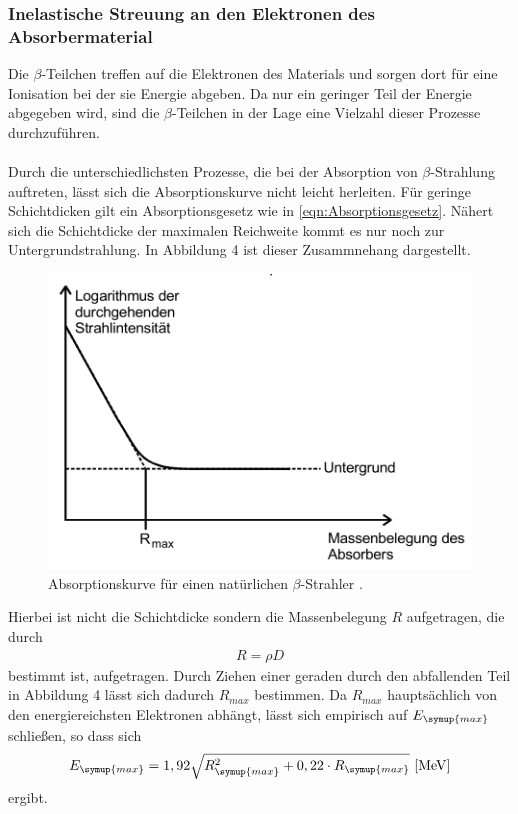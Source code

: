 \subsubsection{Inelastische Streuung an den Elektronen des Absorbermaterial}
\label{sec:inelastischeStreuungAbsorber}
Die $\beta$-Teilchen treffen auf die Elektronen des Materials und sorgen dort für eine Ionisation bei
der sie Energie abgeben. Da nur ein geringer Teil der Energie abgegeben wird, sind die $\beta$-Teilchen
in der Lage eine Vielzahl dieser Prozesse durchzuführen.\\
\\
Durch die unterschiedlichsten Prozesse, die bei der Absorption von $\beta$-Strahlung auftreten, lässt sich
die Absorptionskurve nicht leicht herleiten. Für geringe Schichtdicken gilt ein Absorptionsgesetz wie in
\autoref{eqn:Absorptionsgesetz}. Nähert sich die Schichtdicke der maximalen Reichweite kommt es nur noch
zur Untergrundstrahlung. In Abbildung 4 ist dieser Zusammnehang dargestellt.
\begin{figure}
    \centering
    \label{fig:Absorptionskurveb}
    \includegraphics{Bilder/Absorptionskurve.png}
    \caption{Absorptionskurve für einen natürlichen $\beta$-Strahler \cite{sample}.}
\end{figure}
Hierbei ist nicht die Schichtdicke sondern die Massenbelegung $R$ aufgetragen, die durch
\begin{align}
    \label{eqn:Massenbelegung}
    R = \rho D
\end{align}
bestimmt ist, aufgetragen. Durch Ziehen einer geraden durch den abfallenden Teil in Abbildung 4 lässt sich
dadurch $R_{max}$ bestimmen. Da $R_{max}$ hauptsächlich von den energiereichsten Elektronen abhängt, lässt sich
empirisch auf $E_{\symup{max}}$ schließen, so dass sich
\begin{align}
    \label{eqn:emax}
    E_{\symup{max}} = 1,92 \sqrt{R_{\symup{max}}^2 + 0,22\cdot R_{\symup{max}}} \,\, [\unit{\mega\eV}]
\end{align}
ergibt.